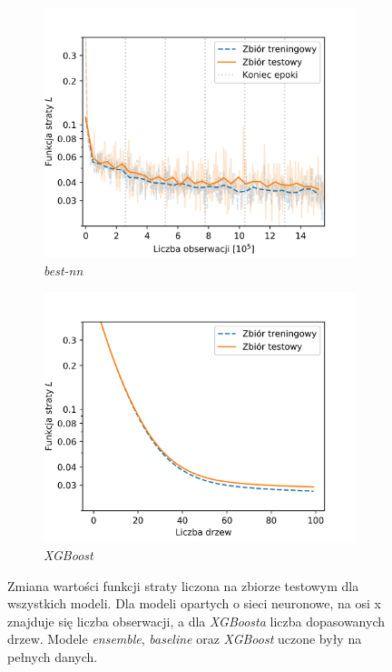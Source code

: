 \documentclass{pracalicmgr}
\begin{document}
\begin{figure}[H]
\begin{subfigure}{.5\textwidth}
	\includegraphics[width=1\textwidth]{loss_best-nn.png}
	\caption{\textit{best-nn}}
	\end{subfigure}
	\begin{subfigure}{.5\textwidth}
	\centering
	\includegraphics[width=1\textwidth]{loss_xgb.png}
	\caption{\textit{XGBoost}}
	\end{subfigure}
	\caption{Zmiana wartości funkcji straty liczona na zbiorze testowym dla wszystkich modeli. Dla modeli opartych o sieci neuronowe, na osi x znajduje się liczba obserwacji, a dla \textit{XGBoosta} liczba dopasowanych drzew. Modele \textit{ensemble}, \textit{baseline} oraz \textit{XGBoost} uczone były na pełnych danych.}
	\label{fig:loss}
	\end{figure}	
	
\end{document}
